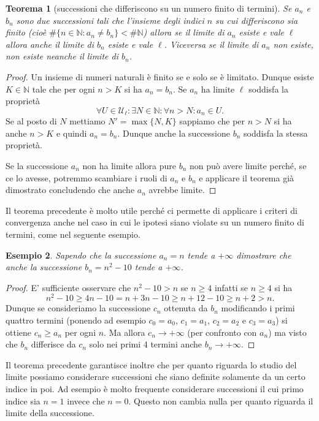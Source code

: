 \documentclass[italian,a4paper,oneside,headinclude]{scrbook}
\newcommand{\U}{\mathcal U}
\newcommand{\NN}{\mathbb N}
\newtheorem{theorem}{Teorema}
\newtheorem{example}[theorem]{Esempio}
\begin{document}
\begin{theorem}[successioni che differiscono su un numero finito di termini]
Se $a_n$ e $b_n$ sono due successioni tali che l'insieme degli indici
$n$ su cui differiscono sia finito
(cioè $\#\{n\in \NN\colon a_n \neq b_n\} < \# \NN$)
allora se il limite di $a_n$ esiste e vale $\ell$ allora
anche il limite di $b_n$ esiste e vale $\ell$.
Viceversa se il limite di $a_n$ non esiste, non esiste neanche il limite
di $b_n$.
\end{theorem}
%
\begin{proof}
Un insieme di numeri naturali è finito se e solo se è limitato.
Dunque esiste $K\in \NN$ tale che per ogni $n>K$ si ha $a_n = b_n$.
Se $a_n$ ha limite $\ell$ soddisfa la proprietà
\[
 \forall U \in \U_\ell \colon
 \exists N\in \NN\colon \forall n > N \colon a_n \in U.
\]
Se al posto di $N$ mettiamo $N' = \max\{N,K\}$ sappiamo che per $n>N$
si ha anche $n>K$ e quindi $a_n=b_n$. Dunque anche la successione $b_n$
soddisfa la stessa proprietà.

Se la successione $a_n$ non ha limite allora pure $b_n$ non può avere limite
perché, se ce lo avesse, potremmo scambiare i ruoli di $a_n$ e $b_n$
e applicare il teorema già dimostrato concludendo che anche $a_n$ avrebbe limite.
\end{proof}

Il teorema precedente è molto utile perché ci permette di applicare
i criteri di convergenza anche nel caso in cui le ipotesi siano violate
su un numero finito di termini, come nel seguente esempio.

\begin{example}
Sapendo che la successione $a_n = n$ tende a $+\infty$ dimostrare
che anche la successione $b_n = n^2-10$ tende a $+\infty$.
\end{example}
%
\begin{proof}
E' sufficiente osservare che $n^2-10 > n$ se $n\ge 4$ infatti
se $n\ge 4$ si ha
\[
n^2 - 10 \ge 4 n -10 = n + 3n - 10 \ge n + 12 -10 \ge n+2 > n.
\]
Dunque se consideriamo la successione $c_n$ ottenuta da $b_n$
modificando i primi quattro termini (ponendo ad esempio $c_0 = a_0$,
$c_1=a_1$, $c_2=a_2$ e $c_3=a_3$) si ottiene $c_n\ge a_n$ per ogni $n$.
Ma allora $c_n \to +\infty$ (per confronto con $a_n$) ma visto che
$b_n$ differisce da $c_n$ solo nei primi 4 termini anche $b_n\to +\infty$.
\end{proof}

Il teorema precedente garantisce inoltre
che per quanto riguarda lo studio del limite possiamo considerare
successioni che siano definite solamente da un certo indice in poi.
Ad esempio è molto frequente considerare successioni il cui primo indice sia
$n=1$ invece che $n=0$. Questo non cambia nulla per quanto riguarda il limite
della successione.
\end{document}
